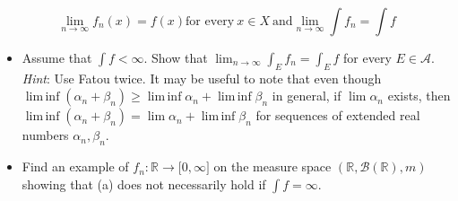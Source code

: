 \documentclass{qlnotes-export}
\begin{document}
\[\lim\limits_{n\rightarrow\infty}f_{n}(x) = f(x)\text{for every}\ x \in X\ \text{and}\lim\limits_{n\rightarrow\infty}\int f_{n} = \int f\]

\begin{itemize}
\item
  Assume that \(\int f < \infty\). Show that \(\lim_{n\rightarrow\infty}\int_{E}f_{n} = \int_{E}f\) for every \(E \in \mathcal{A}\). \emph{Hint}: Use Fatou twice. It may be useful to note that even though \(\operatorname{lim\, inf}(\alpha_{n} + \beta_{n}) \geq \operatorname{lim\, inf}\alpha_{n} + \operatorname{lim\, inf}\beta_{n}\) in general, if \(\lim\alpha_{n}\) exists, then \(\operatorname{lim\, inf}(\alpha_{n} + \beta_{n}) = \lim\alpha_{n} + \operatorname{lim\, inf}\beta_{n}\) for sequences of extended real numbers \(\alpha_{n},\beta_{n}\).
\item
  Find an example of \(f_{n}:{\mathbb{R}}\rightarrow\lbrack 0,\infty\rbrack\) on the measure space \(({\mathbb{R}},\mathcal{B}({\mathbb{R}}),m)\) showing that (a) does not necessarily hold if \(\int f = \infty\).
\end{itemize}
\end{document}
